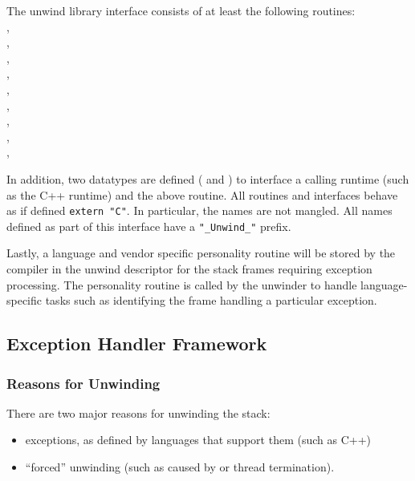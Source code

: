 The unwind library interface consists of at least the following routines:\\
,\\
,\\
,\\
,\\
,\\
,\\
,\\
,\\
,\\

In addition, two datatypes are defined (
and ) to interface a calling runtime
(such as the C++ runtime) and the above routine. All routines and
interfaces behave as if defined \texttt{extern "C"}. In particular,
the names are not mangled. All names defined as part of this interface
have a \texttt{"\_Unwind\_"} prefix.

Lastly, a language and vendor specific personality routine will be
stored by the compiler in the unwind descriptor for the stack frames
requiring exception processing. The personality routine is called by
the unwinder to handle language-specific tasks such as identifying the
frame handling a particular exception.

\subsection{Exception Handler Framework}

\subsubsection{Reasons for Unwinding}
There are two major reasons for unwinding the stack:
\begin{itemize}
  \item exceptions, as defined by languages that support them (such as C++)
  \item ``forced'' unwinding (such as caused by  or thread
    termination).
\end{itemize}

